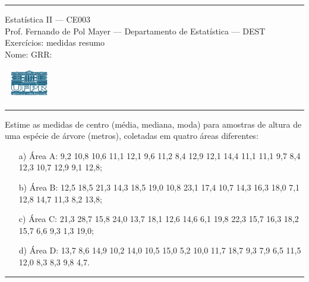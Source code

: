 \documentclass[a4paper,11pt,fleqn]{article}\usepackage[]{graphicx}\usepackage[]{color}
\theoremstyle{definition}
\begin{document}
\reversemarginpar %





\hrule
\vspace{0.3cm}

\begin{minipage}[c]{.85\textwidth}
  Estatística II --- CE003 \\
  Prof. Fernando de Pol Mayer --- Departamento de Estatística --- DEST \\
  Exercícios: medidas resumo \\
  Nome:   \hfill GRR: \hspace{2cm}
\end{minipage}\hfill
\begin{minipage}[c]{.15\textwidth}
\flushright
\includegraphics[width=2.2cm]{../img/ufpr-logo.png}
\end{minipage}

\vspace{0.3cm}
\hrule
\vspace{0.3cm}

\begin{compactenum}[1.]
\item Estime as medidas de centro (média, mediana,
  moda) para amostras de altura de uma espécie de árvore (metros),
  coletadas em quatro áreas diferentes:
  \begin{itemize}
  \item[a)] Área A: 9,2 10,8 10,6 11,1 12,1 9,6 11,2 8,4 12,9 12,1
    14,4 11,1 11,1 9,7 8,4 12,3 10,7 12,9 9,1 12,8;
  \item[b)] Área B: 12,5 18,5 21,3 14,3 18,5 19,0 10,8 23,1 17,4 10,7
    14,3 16,3 18,0 7,1 12,8 14,7 11,3 8,2 13,8;
  \item[c)] Área C: 21,3 28,7 15,8 24,0 13,7 18,1 12,6 14,6 6,1 19,8
    22,3 15,7 16,3 18,2 15,7 6,6 9,3 1,3 19,0;
  \item[d)] Área D: 13,7 8,6 14,9 10,2 14,0 10,5 15,0 5,2 10,0 11,7
    18,7 9,3 7,9 6,5 11,5 12,0 8,3 8,3 9,8 4,7.
  \end{itemize}

\end{compactenum}

\vspace{0.3cm}
\hrule
\vspace{0.3cm}
\end{document}
